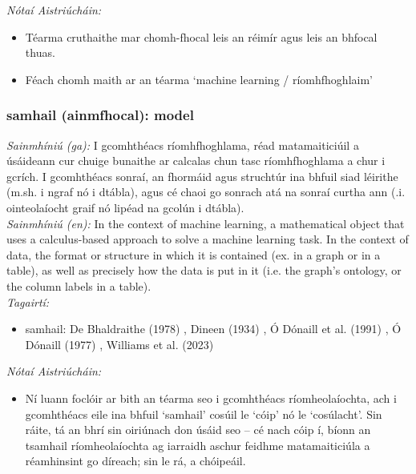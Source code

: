  \noindent \textit{Nótaí Aistriúcháin:}
\begin{itemize}
	\item Téarma cruthaithe mar chomh-fhocal leis an réimír agus leis an bhfocal thuas.
	\item Féach chomh maith ar an téarma `machine learning / ríomhfhoghlaim'
\end{itemize}


\subsubsection*{samhail (ainmfhocal): model}
 \noindent \textit{Sainmhíniú (ga):} I gcomhthéacs ríomhfhoghlama, réad matamaiticiúil a úsáideann cur chuige bunaithe ar calcalas chun tasc ríomhfhoghlama a chur i gcrích. I gcomhthéacs sonraí, an fhormáid agus struchtúr ina bhfuil siad léirithe (m.sh. i ngraf nó i dtábla), agus cé chaoi go sonrach atá na sonraí curtha ann (.i. ointeolaíocht graif nó lipéad na gcolún i dtábla).
\\
 \noindent \textit{Sainmhíniú (en):} In the context of machine learning, a mathematical object that uses a calculus-based approach to solve a machine learning task. In the context of data, the format or structure in which it is contained (ex. in a graph or in a table), as well as precisely how the data is put in it (i.e. the graph's ontology, or the column labels in a table).
\\
 \noindent \textit{Tagairtí:}
\begin{itemize}
	\item samhail: De Bhaldraithe (1978) \cite{de-bhaldraithe}, Dineen (1934) \cite{dineen}, Ó Dónaill et al. (1991) \cite{focloir-beag}, Ó Dónaill (1977) \cite{odonaill}, Williams et al. (2023) \cite{storchiste}
\end{itemize}

 \noindent \textit{Nótaí Aistriúcháin:}
\begin{itemize}
	\item Ní luann foclóir ar bith an téarma seo i gcomhthéacs ríomheolaíochta, ach i gcomhthéacs eile ina bhfuil `samhail' cosúil le `cóip' nó le `cosúlacht'. Sin ráite, tá an bhrí sin oiriúnach don úsáid seo -- cé nach cóip í, bíonn an tsamhail ríomheolaíochta ag iarraidh aschur feidhme matamaiticiúla a réamhinsint go díreach; sin le rá, a chóipeáil.
\end{itemize}


